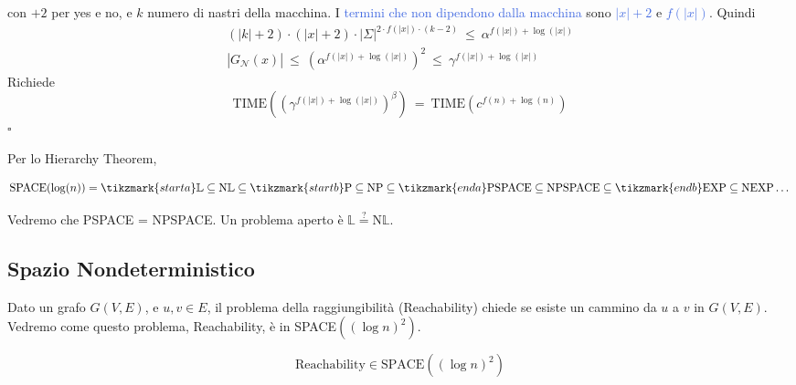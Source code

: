 con $+2$ per yes e no, e $k$ numero di nastri della macchina. I \textcolor{RoyalBlue}{termini che non dipendono dalla macchina} sono \textcolor{RoyalBlue}{$|x|+2$} e \textcolor{RoyalBlue}{$f(|x|)$}. Quindi
\begin{eqnarray*}
    (|k|+2)\cdot(|x|+2)\cdot|\Sigma|^{2\cdot f(|x|)\cdot(k-2)}~ \leq~ \alpha^{f(|x|)+\log(|x|)}\\
    |G_\mathcal{N}(x)| ~\leq ~\left(\alpha^{f(|x|)+\log(|x|)}\right)^2 ~\leq ~\gamma^{f(|x|)+\log(|x|)}
\end{eqnarray*}
Richiede
$$
    \text{TIME}\left(\left( \gamma^{f(|x|)+\log(|x|)} \right)^\beta\right)
    ~=~
    \text{TIME}\left( c^{f(n)+\log(n)} \right)
$$
\hfill $\square$

\begin{corollary}
    Per lo Hierarchy Theorem,
    ~

    $$
        \text{SPACE}(\log(n))=\tikzmark{starta}\mathbb{L}\subseteq\text{N}\mathbb{L}\subseteq\tikzmark{startb}\text{P}\subseteq\text{NP}\subseteq\tikzmark{enda}\text{PSPACE}\subseteq\text{NPSPACE}\subseteq\tikzmark{endb}\text{EXP}\subseteq\text{NEXP}\dots
    $$
\end{corollary}
Vedremo che PSPACE = NPSPACE. Un problema aperto è $\mathbb{L}\overset{?}{=}\text{N}\mathbb{L}$.


\subsection{Spazio Nondeterministico}
Dato un grafo $G(V,E)$, e $u,v\in E$, il problema della raggiungibilità (Reachability) chiede se esiste un cammino da $u$ a $v$ in $G(V,E)$. Vedremo come questo problema, Reachability, è in SPACE$((\log n)^2)$.

\begin{theorem}[Savitch]
    $$
        \text{Reachability}\in\text{SPACE}((\log n)^2)
    $$
\end{theorem}

